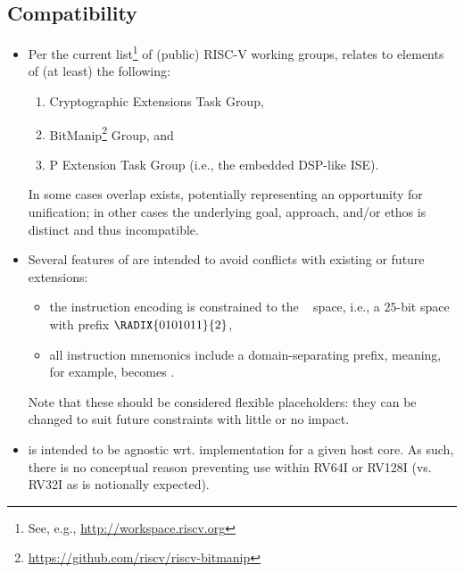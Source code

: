 
\subsection{Compatibility}
\label{sec:bg:compatibility}

\begin{itemize}

\item Per the current list\footnote{
      See, e.g., \url{http://workspace.riscv.org}
      } of (public) RISC-V working groups, 
      \XCID relates to elements of (at least) the following:

      \begin{enumerate}
      \item Cryptographic Extensions Task Group,
      \item BitManip\footnote{
            \url{https://github.com/riscv/riscv-bitmanip}
            }                             Group,
            and
      \item P             Extension  Task Group (i.e., the embedded DSP-like ISE).
      \end{enumerate}

      \noindent
      In some cases overlap exists, potentially representing an opportunity
      for unification; in other cases the underlying goal, approach, and/or
      ethos is distinct and thus incompatible.

\item Several features of \XCID are intended to avoid conflicts with existing 
      or future extensions:

      \begin{itemize}
      \item the instruction encoding is constrained to the 
            ~\cite[Table 19.1]{SCARV:RV:ISA:I:17}
            space, i.e., a $25$-bit space with prefix $\RADIX{0101011}{2}$,
      \item all instruction mnemonics include a domain-separating prefix,
            meaning, for example,  becomes .
      \end{itemize}
      
      \noindent
      Note that these should be considered flexible placeholders: they can
      be changed to suit future constraints with little or no impact.

\item \XCID is intended to be agnostic wrt. implementation for a given host 
      core.  As such, there is no conceptual reason preventing use within
      RV64I or RV128I (vs. RV32I as is notionally expected).  

\end{itemize}

